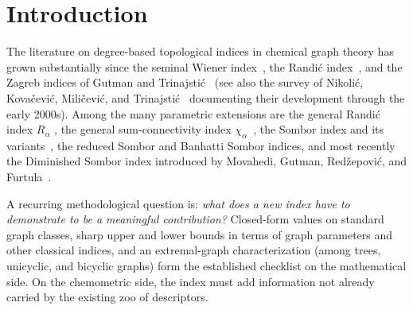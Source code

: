 \documentclass[11pt,a4paper]{article}
\theoremstyle{definition}
\begin{document}
\begin{abstract}
\medskip
\noindent\textbf{Keywords.} Topological index, bond-incident-degree
index, Randi\'c index, Sombor index, Wuzi index family,
sensitivity analysis, extremal graph.

\medskip
\noindent\textbf{Code and data.}
\url{https://github.com/Singati2/topological-index-orthogonality}
\end{abstract}

\section{Introduction}

The literature on degree-based topological indices in chemical
graph theory has grown substantially since the seminal Wiener
index~\cite{Wiener1947}, the Randi\'c index~\cite{Randic1975},
and the Zagreb indices of Gutman and
Trinajsti\'c~\cite{Gutman1972} (see also the survey of
Nikoli\'c, Kova\v{c}evi\'c, Mili\v{c}evi\'c, and Trinajsti\'c~\cite{NikolicKovacevicMilicevicTrinajstic2003}
documenting their development through the early
2000s). Among the many
parametric extensions are the general Randi\'c index $R_\alpha$
\cite{BollobasErdos1998}, the general sum-connectivity index
$\chi_\alpha$~\cite{ZhouTrinajstic2009sumconn}, the Sombor index and
its variants~\cite{Gutman2021Sombor}, the reduced Sombor and Banhatti
Sombor indices, and most recently the Diminished Sombor index
introduced by Movahedi, Gutman, Red\v{z}epovi\'c, and
Furtula~\cite{MovahediGutmanRedzepovicFurtula2026}.

A recurring methodological question is: \emph{what does a new index
have to demonstrate to be a meaningful contribution?} Closed-form
values on standard graph classes, sharp upper and lower bounds in
terms of graph parameters and other classical indices, and an
extremal-graph characterization (among trees, unicyclic, and
bicyclic graphs) form the established checklist on the
mathematical side. On the chemometric side, the index must add
information not already carried by the existing zoo of descriptors.
\end{document}
